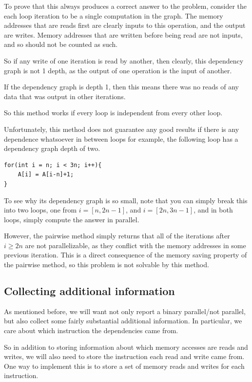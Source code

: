 \documentclass[12pt,twoside]{reedthesis}
\begin{document}
		To prove that this always produces a correct answer to the problem, consider the each loop iteration to be a single computation in the graph. The memory addresses that are reads first are clearly inputs to this operation, and the output are writes. Memory addresses that are written before being read are not inputs, and so should not be counted as such. 
		
		So if any write of one iteration is read by another, then clearly, this dependency graph is not 1 depth, as the output of one operation is the input of another. 
		
		If the dependency graph is depth 1, then this means there was no reads of any data that was output in other iterations. 
		
		So this method works if every loop is independent from every other loop. 
		
		Unfortunately, this method does not guarantee any good results if there is any dependence whatsoever in between loops for example, the following loop has a dependency graph depth of two. 
		
\begin{lstlisting}
for(int i = n; i < 3n; i++){
	A[i] = A[i-n]+1;
}
\end{lstlisting}

		To see why its dependency graph is so small, note that you can simply break this into two loops, one from $i = [n,2n-1]$, and $i=[2n,3n-1]$, and in both loops, simply compute the answer in parallel. 

		However, the pairwise method simply returns that all of the iterations after $i \ge 2n$ are not parallelizable, as they conflict with the memory addresses in some previous iteration. This is a direct consequence of the memory saving property of the pairwise method, so this problem is not solvable by this method.  
	
		\subsection{Collecting additional information}
		
		As mentioned before, we will want not only report a binary parallel/not parallel, but also collect some fairly substantial additional information. In particular, we care about which instruction the dependencies came from. 
		
		So in addition to storing information about which memory accesses are reads and writes, we will also need to store the instruction each read and write came from. One way to implement this is to store a set of memory reads and writes for each instruction. 
		
\end{document}

